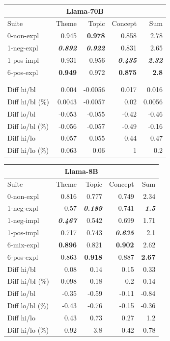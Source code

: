 \begin{table}
    \centering
    \scriptsize
    \begin{tabular}{lrrrr}
    \toprule
    \multicolumn{5}{c}{\textbf{Llama-70B}} \\
    \midrule
    Suite & Theme & Topic & Concept & Sum \\
    \midrule
    0-non-expl & 0.945 & \bfseries 0.978 & 0.858 & 2.78 \\
    1-neg-expl & \bfseries \itshape 0.892 & \bfseries \itshape 0.922 & 0.831 & 2.65 \\
    1-pos-impl & 0.931 & 0.956 & \bfseries \itshape 0.435 & \bfseries \itshape 2.32 \\
    6-pos-expl & \bfseries 0.949 & 0.972 & \bfseries 0.875 & \bfseries 2.8 \\
     & & & & \\
     & & & & \\
    \midrule
    Diff hi/bl & 0.004 & -0.0056 & 0.017 & 0.016 \\
    Diff hi/bl (\%) & 0.0043 & -0.0057 & 0.02 & 0.0056 \\
    Diff lo/bl & -0.053 & -0.055 & -0.42 & -0.46 \\
    Diff lo/bl (\%) & -0.056 & -0.057 & -0.49 & -0.16 \\
    Diff hi/lo & 0.057 & 0.055 & 0.44 & 0.47 \\
    Diff hi/lo (\%) & 0.063 & 0.06 & 1 & 0.2 \\
    \bottomrule
    \end{tabular}
    \begin{tabular}{lrrrr}
    \toprule
    \multicolumn{5}{c}{\textbf{Llama-8B}} \\
    \midrule
    Suite & Theme & Topic & Concept & Sum \\
    \midrule
    0-non-expl & 0.816 & 0.777 & 0.749 & 2.34 \\
    1-neg-expl & 0.57 & \bfseries \itshape 0.189 & 0.741 & \bfseries \itshape 1.5 \\
    1-neg-impl & \bfseries \itshape 0.467 & 0.542 & 0.699 & 1.71 \\
    1-pos-impl & 0.717 & 0.743 & \bfseries \itshape 0.635 & 2.1 \\
    6-mix-expl & \bfseries 0.896 & 0.821 & \bfseries 0.902 & 2.62 \\
    6-pos-expl & 0.863 & \bfseries 0.918 & 0.887 & \bfseries 2.67 \\
    \midrule
    Diff hi/bl & 0.08 & 0.14 & 0.15 & 0.33 \\
    Diff hi/bl (\%) & 0.098 & 0.18 & 0.2 & 0.14 \\
    Diff lo/bl & -0.35 & -0.59 & -0.11 & -0.84 \\
    Diff lo/bl (\%) & -0.43 & -0.76 & -0.15 & -0.36 \\
    Diff hi/lo & 0.43 & 0.73 & 0.27 & 1.2 \\
    Diff hi/lo (\%) & 0.92 & 3.8 & 0.42 & 0.78 \\
    \bottomrule
    \end{tabular}
    

\end{table}
